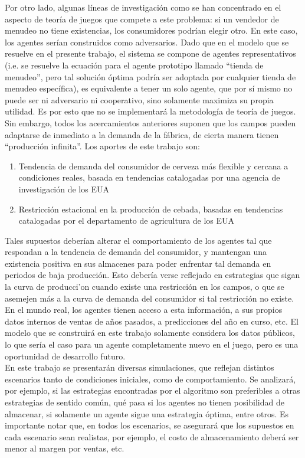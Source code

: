 Por otro lado, algunas l\'ineas de investigaci\'on como \citet{Busoniu} se han concentrado en el aspecto de teor\'ia de juegos que compete a este problema: si un vendedor de menudeo no tiene existencias, los consumidores podr\'ian elegir otro. En este caso, los agentes ser\'ian construidos como adversarios. Dado que en el modelo que se resuelve en el presente trabajo, el sistema se compone de agentes representativos (i.e. se resuelve la ecuaci\'on para el agente prototipo llamado ``tienda de menudeo'', pero tal soluci\'on \'optima podr\'ia ser adoptada por cualquier tienda de menudeo espec\'ifica), es equivalente a tener un solo agente, que por s\'i mismo no puede ser ni adversario ni cooperativo, sino solamente maximiza su propia utilidad. Es por esto que no se implementar\'a la metodolog\'ia de teor\'ia de juegos.\\

Sin embargo, todos los acercamientos anteriores suponen que los campos pueden adaptarse de inmediato a la demanda de la f\'abrica, de cierta manera tienen ``producci\'on infinita''. Los aportes de este trabajo son:

\begin{enumerate}
    \item Tendencia de demanda del consumidor de cerveza m\'as flexible y cercana a condiciones reales, basada en tendencias catalogadas por una agencia de investigaci\'on de los EUA
    \item Restricci\'on estacional en la producci\'on de cebada, basadas en tendencias catalogadas por el departamento de agricultura de los EUA
\end{enumerate}

Tales supuestos deber\'ian alterar el comportamiento de los agentes tal que respondan a la tendencia de demanda del consumidor, y mantengan una existencia positiva en sus almacenes para poder enfrentar tal demanda en periodos de baja producci\'on. Esto deber\'ia verse reflejado en estrategias que sigan la curva de producci'on cuando existe una restricci\'on en los campos, o que se asemejen m\'as  a la curva de demanda del consumidor si tal restricci\'on no existe.\\

En el mundo real, los agentes tienen acceso a esta informaci\'on, a sus propios datos internos de ventas de a\~nos pasados, a predicciones del a\~no en curso, etc. El modelo que se construir\'a en este trabajo solamente considera los datos p\'ublicos, lo que ser\'ia el caso para un agente completamente nuevo en el juego, pero es una oportunidad de desarrollo futuro.\\

En este trabajo se presentar\'an diversas simulaciones, que reflejan distintos escenarios tanto de condiciones iniciales, como de comportamiento. Se analizar\'a, por ejemplo, si las estrategias encontradas por el algoritmo son preferibles a otras estrategias de sentido com\'un, qu\'e pasa si los agentes no tienen posibilidad de almacenar, si solamente un agente sigue una estrategia \'optima, entre otros. Es importante notar que, en todos los escenarios, se asegurar\'a que los supuestos en cada escenario sean realistas, por ejemplo, el costo de almacenamiento deber\'a ser menor al margen por ventas, etc.


